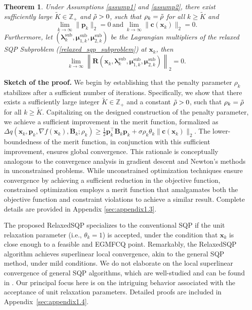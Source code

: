 \documentclass[aos]{imsart}
\numberwithin{equation}{section}
\theoremstyle{plain}
\newtheorem{theorem}{Theorem}
\begin{document}
\begin{theorem}
\label{theorem_det_sqp}
Under Assumptions \ref{assump1} and \ref{assump2}, there exist sufficiently large $\widetilde{K} \in \mathbb{Z}_{+}$ and $\Tilde{\rho}>0$, such that $\rho_k = \Tilde{\rho}$ for all $k \geq \widetilde{K}$ and 
\begin{equation}
\label{eq4}
    \lim_{k \to \infty} \|\bm{p}_k\|_2 = 0~\text{and}~ \lim_{k \to \infty} \|\bm{c}(\bm{x}_k)\|_2 = 0.
\end{equation}
Furthermore, let $(\bm{\lambda}_k^{\text{sub}}, \bm{\mu}_{1,k}^{\text{sub}},\bm{\mu}_{2,k}^{\text{sub}})$ be the Lagrangian multipliers of the relaxed SQP Subproblem (\ref{relaxed_sqp_subproblem}) at $\bm{x}_k$, then 
\begin{equation}
\label{eq5}
    \lim_{k \to \infty} \left\| \bm{R}(\bm{x}_k, \bm{\lambda}_k^{\text{sub}}, \bm{\mu}_{1,k}^{\text{sub}}, \bm{\mu}_{2,k}^{\text{sub}}) \right\|_2 = 0.
\end{equation}
\end{theorem}


\textbf{Sketch of the proof.} We begin by establishing that the penalty parameter $\rho_k$ stabilizes after a sufficient number of iterations. Specifically, we show that there exists a sufficiently large integer $\widetilde{K} \in \mathbb{Z}_{+}$ and a constant $\Tilde{\rho} > 0$, such that $\rho_k = \Tilde{\rho}$ for all $k \geq \widetilde{K}$.
Capitalizing on the designed construction of the penalty parameter, we achieve a sufficient improvement in the merit function, formalized as $\Delta q(\bm{x}_k,\bm{p}_k,\nabla f(\bm{x}_k),\bm{B}_k;\rho_k) \geq \frac{1}{2} \bm{p}_k^{\top} \bm{B}_k \bm{p}_k + \sigma \rho_k \theta_k \|\bm{c}(\bm{x}_k)\|_2$. The lower-boundedness of the merit function, in conjunction with this sufficient improvement, ensures global convergence. This rationale is conceptually analogous to the convergence analysis in gradient descent and Newton's methods in unconstrained problems. 
While unconstrained optimization techniques ensure convergence by achieving a sufficient reduction in the objective function, constrained optimization employs a merit function that amalgamates both the objective function and constraint violations to achieve a similar result. Complete details are provided in Appendix \ref{sec:appendix1.3}.


The proposed RelaxedSQP specializes to the conventional SQP if the unit relaxation parameter (i.e., $\theta_k =1$) is accepted, under the condition that $\bm{x}_k$ is close enough to a feasible and EGMFCQ point. Remarkably, the RelaxedSQP algorithm achieves superlinear local convergence, akin to the general SQP method, under mild conditions. 
We do not elaborate on the local superlinear convergence of general SQP algorithms, which are well-studied and can be found in \cite{jorge2006numerical, ulbrich2004superlinear, boggs1995sequential, liu2011sequential, schittkowski2010sequential}. 
Our principal focus here is on the intriguing behavior associated with the acceptance of unit relaxation parameters. Detailed proofs are included in Appendix~\ref{sec:appendix1.4}.
\end{document}
